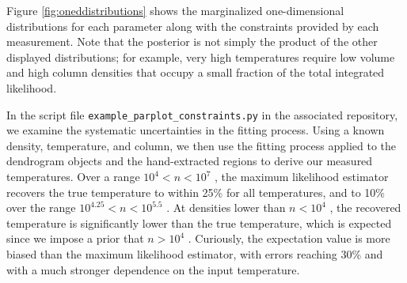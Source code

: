 Figure \ref{fig:oneddistributions} shows the marginalized one-dimensional
distributions for each parameter along with the constraints provided by each
measurement.  Note that the posterior is not simply the product of the other
displayed distributions; for example, very high temperatures require low
volume and high column densities that occupy a small fraction of the total
integrated likelihood.

In the script file \texttt{example\_parplot\_constraints.py} in the associated
repository, we examine the systematic uncertainties in the fitting process.
Using a known density, temperature, and column, we then use the fitting process
applied to the dendrogram objects and the hand-extracted regions to derive our
measured temperatures.  Over a range $10^4 < n < 10^7$ \percc, the maximum
likelihood estimator recovers the true temperature to within 25\% for all
temperatures, and to 10\% over the range $10^{4.25} < n < 10^{5.5}$ \percc.  At
densities lower than $n<10^4$ \percc, the recovered temperature is
significantly lower than the true temperature, which is expected since we
impose a prior that $n>10^4$ \percc.  Curiously, the expectation value is more
biased than the maximum likelihood estimator, with errors reaching 30\% and
with a much stronger dependence on the input temperature.

